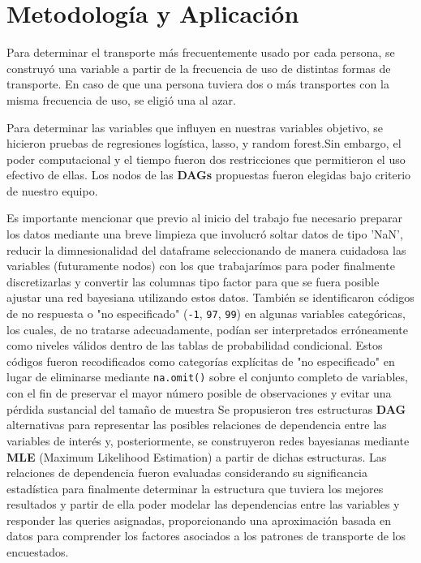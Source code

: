 \documentclass[12pt,a4paper]{article}
\begin{document}
\section{Metodología y Aplicación}
Para determinar el transporte más frecuentemente usado por cada persona, se construyó una variable a partir de la frecuencia de uso de distintas formas de transporte. En caso de que una persona tuviera dos o más transportes con la misma frecuencia de uso, se eligió una al azar. 

Para determinar las variables que influyen en nuestras variables objetivo, se hicieron pruebas de regresiones logística, lasso, y random forest.Sin embargo, el poder computacional y el tiempo fueron dos restricciones que permitieron el uso efectivo de ellas. Los nodos de las \textbf{DAGs} propuestas fueron elegidas bajo criterio de nuestro equipo. 

Es importante mencionar que previo al inicio del trabajo fue necesario preparar los datos mediante una breve limpieza que involucró soltar datos de tipo 'NaN', reducir la dimnesionalidad del dataframe seleccionando de manera cuidadosa las variables (futuramente nodos) con los que trabajarímos para poder finalmente discretizarlas y convertir las columnas tipo factor para que se fuera posible ajustar una red bayesiana utilizando estos datos. 
También se identificaron códigos de no respuesta o "no especificado" (\texttt{-1}, \texttt{97}, \texttt{99}) en algunas variables categóricas, los cuales, de no tratarse adecuadamente, podían ser interpretados erróneamente como niveles válidos dentro de las tablas de probabilidad condicional. Estos códigos fueron recodificados como categorías explícitas de "no especificado" en lugar de eliminarse mediante \texttt{na.omit()} sobre el conjunto completo de variables, con el fin de preservar el mayor número posible de observaciones y evitar una pérdida sustancial del tamaño de muestra
Se propusieron tres estructuras \textbf{DAG} alternativas para representar las posibles relaciones de dependencia entre las variables de interés y, posteriormente, se construyeron redes bayesianas mediante \textbf{MLE} (Maximum Likelihood Estimation) a partir de dichas estructuras. Las relaciones de dependencia fueron evaluadas considerando su significancia estadística para finalmente determinar la estructura que tuviera los mejores resultados y partir de ella poder modelar las dependencias entre las variables y responder las queries asignadas, proporcionando una aproximación basada en datos para comprender los factores asociados a los patrones de transporte de los encuestados.
\end{document}
